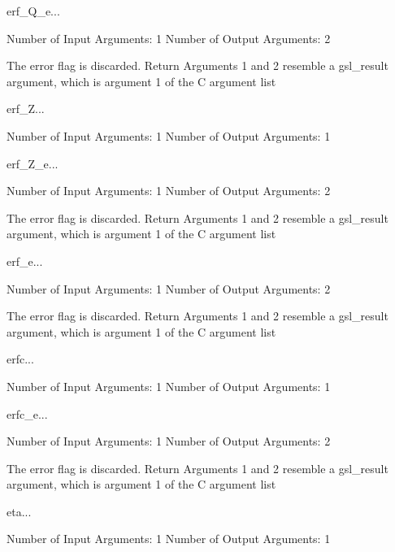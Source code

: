 \begin{funcdesc}{erf_Q_e}{...}

    Number of Input  Arguments:  1
    Number of Output Arguments:  2

The error flag is discarded.
Return Arguments 1 and 2 resemble a gsl_result argument,
	which is  argument 1 of the C argument list

\end{funcdesc}

\begin{funcdesc}{erf_Z}{...}

    Number of Input  Arguments:  1
    Number of Output Arguments:  1
\end{funcdesc}

\begin{funcdesc}{erf_Z_e}{...}

    Number of Input  Arguments:  1
    Number of Output Arguments:  2

The error flag is discarded.
Return Arguments 1 and 2 resemble a gsl_result argument,
	which is  argument 1 of the C argument list

\end{funcdesc}

\begin{funcdesc}{erf_e}{...}

    Number of Input  Arguments:  1
    Number of Output Arguments:  2

The error flag is discarded.
Return Arguments 1 and 2 resemble a gsl_result argument,
	which is  argument 1 of the C argument list

\end{funcdesc}

\begin{funcdesc}{erfc}{...}

    Number of Input  Arguments:  1
    Number of Output Arguments:  1
\end{funcdesc}

\begin{funcdesc}{erfc_e}{...}

    Number of Input  Arguments:  1
    Number of Output Arguments:  2

The error flag is discarded.
Return Arguments 1 and 2 resemble a gsl_result argument,
	which is  argument 1 of the C argument list

\end{funcdesc}

\begin{funcdesc}{eta}{...}

    Number of Input  Arguments:  1
    Number of Output Arguments:  1
\end{funcdesc}

